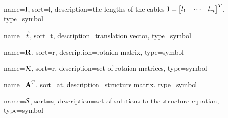 	{%
		name=\ensuremath{\mat{l}},
		sort=l,
		description=the lengths of the cables \ensuremath{\mat{l} = {\left[\begin{matrix}l_1 & \cdots & l_m \end{matrix}\right]}^T},
		type=symbol
	}
	\newcommand{\cablelengths}{\gls{sym:cablelengths}}

	{%
		name=\ensuremath{\vec{t}},
		sort=t,
		description=translation vector,
		type=symbol
	}
	\newcommand{\transvec}{\gls{sym:transvec}}

	{%
		name=\ensuremath{\mat{R}},
		sort=r,
		description=rotaion matrix,
		type=symbol
	}
	\newcommand{\rotmatbare}{\gls{sym:rotmat}}
	\newcommand{\rotmat}[2]{{\project{\rotmatbare}{#1}}_{#2}}

	{%
		name=\ensuremath{\set{R}},
		sort=r,
		description=set of rotaion matrices,
		type=symbol
}
\newcommand{\setofrotationmatrices}{\gls{sym:setofrotationmatrices}}

	{%
		name=\ensuremath{{\mat{A}^T}},
		sort=at,
		description=structure matrix,
		type=symbol
	}
	\newcommand{\strucmat}{\gls{sym:strucmat}}

	{%
		name=\ensuremath{\set{S}},
		sort=s,
		description=set of solutions to the structure equation,
		type=symbol
	}
	\newcommand{\setsolstruceq}{\gls{sym:setsolstruceq}}

